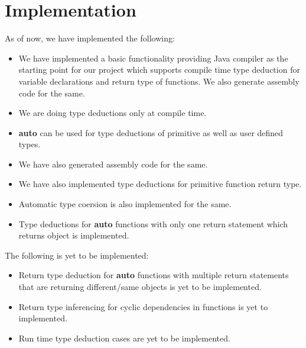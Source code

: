 \section{Implementation}
As of now, we have implemented the following: 
\begin{itemize}
\item We have implemented a basic functionality providing Java compiler as the starting point for our project which supports compile time type deduction for variable declarations and return type of functions. We also generate assembly code for the same. 

\item We are doing type deductions only at compile time. 
\item \textbf{auto} can be used for type deductions of primitive as well as user defined types.

\item We have also generated assembly code for the same. 
\item We have also implemented type deductions for primitive function return type. 

\item Automatic type coersion is also implemented for the same. 

\item Type deductions for \textbf{auto} functions with only one return statement which returns object is implemented. 

\end{itemize}
The following is yet to be implemented: 
\begin{itemize}
\item Return type deduction for \textbf{auto} functions with multiple return statements that are returning different/same objects is yet to be implemented. 

\item Return type inferencing for cyclic dependencies in functions is yet to implemented. 
\item Run time type deduction cases are yet to be implemented. 
\end{itemize}